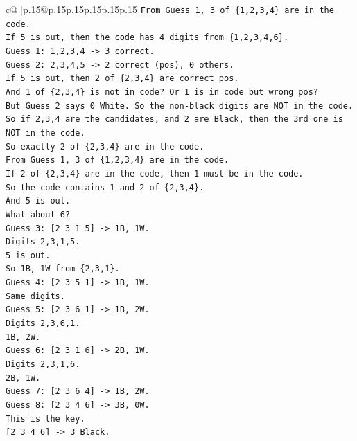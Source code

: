 \documentclass{article}
\begin{document}
{\begin{supertabular}{c@{$\;$}|p{.15\linewidth}@{}p{.15\linewidth}p{.15\linewidth}p{.15\linewidth}p{.15\linewidth}p{.15\linewidth}}
{{{\texttt{From Guess 1, 3 of \{1,2,3,4\} are in the code.} \\
\texttt{If 5 is out, then the code has 4 digits from \{1,2,3,4,6\}.} \\
\texttt{Guess 1: 1,2,3,4 {-}> 3 correct.} \\
\texttt{Guess 2: 2,3,4,5 {-}> 2 correct (pos), 0 others.} \\
\texttt{If 5 is out, then 2 of \{2,3,4\} are correct pos.} \\
\texttt{And 1 of \{2,3,4\} is not in code? Or 1 is in code but wrong pos?} \\
\texttt{But Guess 2 says 0 White. So the non{-}black digits are NOT in the code.} \\
\texttt{So if 2,3,4 are the candidates, and 2 are Black, then the 3rd one is NOT in the code.} \\
\texttt{So exactly 2 of \{2,3,4\} are in the code.} \\
\texttt{From Guess 1, 3 of \{1,2,3,4\} are in the code.} \\
\texttt{If 2 of \{2,3,4\} are in the code, then 1 must be in the code.} \\
\texttt{So the code contains 1 and 2 of \{2,3,4\}.} \\
\texttt{And 5 is out.} \\
\texttt{What about 6?} \\
\texttt{Guess 3: {[}2 3 1 5{]} {-}> 1B, 1W.} \\
\texttt{Digits 2,3,1,5.} \\
\texttt{5 is out.} \\
\texttt{So 1B, 1W from \{2,3,1\}.} \\
\texttt{Guess 4: {[}2 3 5 1{]} {-}> 1B, 1W.} \\
\texttt{Same digits.} \\
\texttt{Guess 5: {[}2 3 6 1{]} {-}> 1B, 2W.} \\
\texttt{Digits 2,3,6,1.} \\
\texttt{1B, 2W.} \\
\texttt{Guess 6: {[}2 3 1 6{]} {-}> 2B, 1W.} \\
\texttt{Digits 2,3,1,6.} \\
\texttt{2B, 1W.} \\
\texttt{Guess 7: {[}2 3 6 4{]} {-}> 1B, 2W.} \\
\texttt{Guess 8: {[}2 3 4 6{]} {-}> 3B, 0W.} \\
\texttt{This is the key.} \\
\texttt{{[}2 3 4 6{]} {-}> 3 Black.} \\
}}}
\end{supertabular}}
\end{document}
